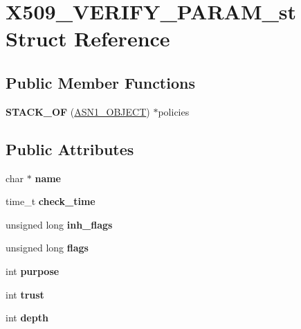 \hypertarget{struct_x509___v_e_r_i_f_y___p_a_r_a_m__st}{}\section{X509\+\_\+\+V\+E\+R\+I\+F\+Y\+\_\+\+P\+A\+R\+A\+M\+\_\+st Struct Reference}
\label{struct_x509___v_e_r_i_f_y___p_a_r_a_m__st}
\subsection*{Public Member Functions}
\begin{DoxyCompactItemize}
\item 
\mbox{\label{struct_x509___v_e_r_i_f_y___p_a_r_a_m__st_a624eee0c97028e3e98e062b25e1f429c}} 
{\bfseries S\+T\+A\+C\+K\+\_\+\+OF} (\hyperlink{structasn1__object__st}{A\+S\+N1\+\_\+\+O\+B\+J\+E\+CT}) $\ast$policies
\end{DoxyCompactItemize}
\subsection*{Public Attributes}
\begin{DoxyCompactItemize}
\item 
\mbox{\label{struct_x509___v_e_r_i_f_y___p_a_r_a_m__st_a60084caf30e3bddf4fe9264a76441411}} 
char $\ast$ {\bfseries name}
\item 
\mbox{\label{struct_x509___v_e_r_i_f_y___p_a_r_a_m__st_a2f5100a1ff11cf55b96ddaf802f434d0}} 
time\+\_\+t {\bfseries check\+\_\+time}
\item 
\mbox{\label{struct_x509___v_e_r_i_f_y___p_a_r_a_m__st_ae194a37f094a45b53ddd8156c5e2bab1}} 
unsigned long {\bfseries inh\+\_\+flags}
\item 
\mbox{\label{struct_x509___v_e_r_i_f_y___p_a_r_a_m__st_a3ef03c3f57b0a90d4182a057fe0c8d27}} 
unsigned long {\bfseries flags}
\item 
\mbox{\label{struct_x509___v_e_r_i_f_y___p_a_r_a_m__st_acae8fafa928701889f757951552f5ee9}} 
int {\bfseries purpose}
\item 
\mbox{\label{struct_x509___v_e_r_i_f_y___p_a_r_a_m__st_a7b7d5b079ed79cb2399ad471d1b57415}} 
int {\bfseries trust}
\item 
\mbox{\label{struct_x509___v_e_r_i_f_y___p_a_r_a_m__st_afb5fd48dac56bdbd2e1d9e8e69bfaf23}} 
int {\bfseries depth}
\end{DoxyCompactItemize}


